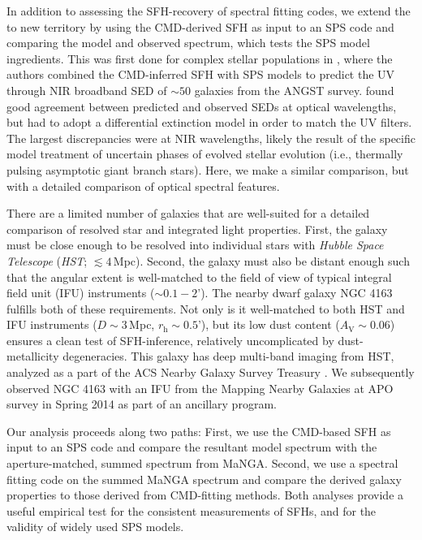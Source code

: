 \documentclass[preprint2]{aastex62}
\newcommand{\Av}{\ensuremath{A_{\mathrm{V}}}\xspace}
\begin{document}
In addition to assessing the SFH-recovery of spectral fitting codes, we extend the \citet{Ruiz-Lara+2018} to new territory by using the CMD-derived SFH as input to an SPS code and comparing the model and observed spectrum, which tests the SPS model ingredients. This was first done for complex stellar populations in \citet{Johnson+2013}, where the authors combined the CMD-inferred SFH with SPS models to predict the UV through NIR broadband SED of $\sim50$ galaxies from the ANGST survey. \citet{Johnson+2013} found good agreement between predicted and observed SEDs at optical wavelengths, but had to adopt a differential extinction model in order to match the UV filters. The largest discrepancies were at NIR wavelengths, likely the result of the specific model treatment of uncertain phases of evolved stellar evolution (i.e., thermally pulsing asymptotic giant branch stars). Here, we make a similar comparison, but with a detailed comparison of optical spectral features.

There are a limited number of galaxies that are well-suited for a detailed comparison of resolved star and integrated light properties. First, the galaxy must be close enough to be resolved into individual stars with \emph{Hubble Space Telescope} (\emph{HST}; $\lesssim4$\,Mpc). Second, the galaxy must also be distant enough such that the angular extent is well-matched to the field of view of typical integral field unit (IFU) instruments (${\sim}0.1-2$'). The nearby dwarf galaxy NGC 4163 fulfills both of these requirements. Not only is it well-matched to both HST and IFU instruments ($D \sim 3$\,Mpc, $r_{\mathrm{h}} \sim 0.5$'), but its low dust content ($\Av \sim 0.06$) ensures a clean test of SFH-inference, relatively uncomplicated by dust-metallicity degeneracies. This galaxy has deep multi-band imaging from HST, analyzed as a part of the ACS Nearby Galaxy Survey Treasury \citep[ANGST;][]{Dalcanton+2009, Dalcanton+2012}. We subsequently observed NGC 4163 with an IFU from the Mapping Nearby Galaxies at APO \citep[MaNGA;][]{Bundy+2015} survey in Spring 2014 as part of an ancillary program.

Our analysis proceeds along two paths: First, we use the CMD-based SFH as input to an SPS code and compare the resultant model spectrum with the aperture-matched, summed spectrum from MaNGA. Second, we use a spectral fitting code on the summed MaNGA spectrum and compare the derived galaxy properties to those derived from CMD-fitting methods. Both analyses provide a useful empirical test for the consistent measurements of SFHs, and for the validity of widely used SPS models. 
\end{document}
